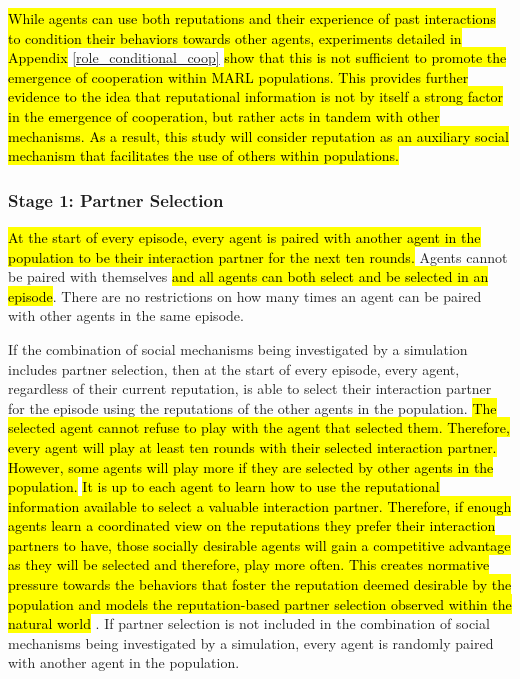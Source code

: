 \documentclass[sn-aps,numbered]{sn-jnl}%
\theoremstyle{thmstyleone}%
\theoremstyle{thmstyletwo}%
\theoremstyle{thmstylethree}%
\begin{document}
\hl{While agents can use both reputations and their experience of past interactions to condition their behaviors towards other agents, experiments detailed in Appendix} \ref{role_conditional_coop} \hl{show that this is not sufficient to promote the emergence of cooperation within MARL populations. This provides further evidence to the idea that reputational information is not by itself a strong factor in the emergence of cooperation, but rather acts in tandem with other mechanisms. As a result, this study will consider reputation as an auxiliary social mechanism that facilitates the use of others within populations.}

\subsubsection{Stage 1: Partner Selection\label{partner_selection_step}}

\hl{At the start of every episode, every agent is paired with another agent in the population to be their interaction partner for the next ten rounds.} Agents cannot be paired with themselves \hl{and all agents can both select and be selected in an episode}. There are no restrictions on how many times an agent can be paired with other agents in the same episode. 

If the combination of social mechanisms being investigated by a simulation includes partner selection, then at the start of every episode, every agent, regardless of their current reputation, is able to select their interaction partner for the episode using the reputations of the other agents in the population. \hl{The selected agent cannot refuse to play with the agent that selected them. Therefore, every agent will play at least ten rounds with their selected interaction partner. However, some agents will play more if they are selected by other agents in the population.} \hl{It is up to each agent to learn how to use the reputational information available to select a valuable interaction partner. Therefore, if enough agents learn a coordinated view on the reputations they prefer their interaction partners to have, those socially desirable agents will gain a competitive advantage as they will be selected and therefore, play more often. This creates normative pressure towards the behaviors that foster the reputation deemed desirable by the population and models the reputation-based partner selection observed within the natural world} \citep{Rand2011, Roberts2021, Milinski2002}. If partner selection is not included in the combination of social mechanisms being investigated by a simulation, every agent is randomly paired with another agent in the population. 
\end{document}
